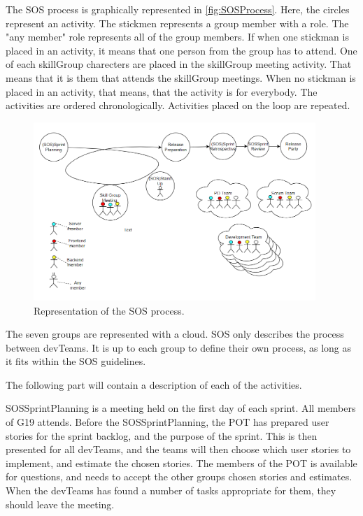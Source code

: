 The SOS process is graphically represented in \autoref{fig:SOSProcess}. Here, the circles represent an activity. The stickmen represents a group member with a role. The "any member" role represents all of the group members. If when one stickman is placed in an activity, it means that one person from the group has to attend. 
One of each \gls{skillGroup} charecters are placed in the \gls{skillGroup} meeting activity. That means that it is them that attends the \gls{skillGroup} meetings.
When no stickman is placed in an activity, that means, that the activity is for everybody. 
The activities are ordered chronologically. Activities placed on the loop are repeated.

\begin{figure}[h]
    \begin{center}
        \includegraphics[width=0.95\textwidth]{figures/SOSProcess}
    \end{center}
    \caption{Representation of the \gls{SOS} process.}
    \label{fig:SOSProcess}
\end{figure}

The seven groups are represented with a cloud. \gls{SOS} only describes the process between \glspl{devTeam}. It is up to each group to define their own process, as long as it fits within the \gls{SOS} guidelines. 

The following part will contain a description of each of the activities.

\Gls{SOSSprintPlanning} is a meeting held on the first day of each sprint. All members of \Gls{G19} attends. Before the \Gls{SOSSprintPlanning}, the \gls{POT} has prepared user stories for the sprint backlog, and the purpose of the sprint. 
This is then presented for all \glspl{devTeam}, and the teams will then choose which user stories to implement, and estimate the chosen stories. 
The members of the \gls{POT} is available for questions, and needs to accept the other groups chosen stories and estimates. 
When the \glspl{devTeam} has found a number of tasks appropriate for them, they should leave the meeting. 
 
